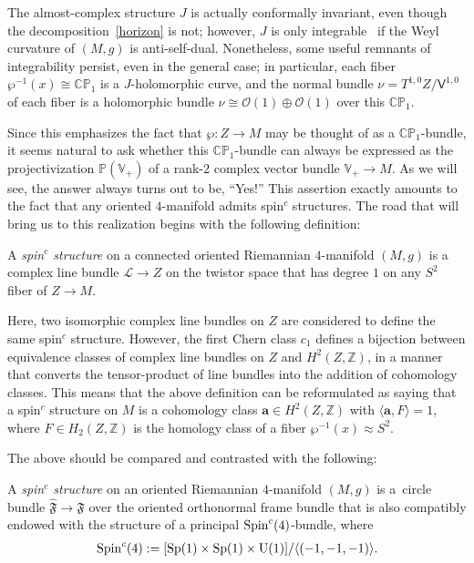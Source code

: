 \documentclass[pdftex]{sigma}
\numberwithin{equation}{section}
\def\CP{\mathbb{CP}}
\def\ZZ{\mathbb{Z}}
\begin{document}
The almost-complex structure $J$ is actually conformally invariant, even though the
decomposition~\eqref{horizon} is not; however, $J$ is only integrable~\cite{AHS,pnlg}
if the Weyl curvature of $(M,g)$ is anti-self-dual. Nonetheless, some useful remnants of integrability persist, even in the general
case; in particular, each fiber $\wp^{-1} (x)\cong \CP_1$ is a $J$-holomorphic curve, and the normal bundle
$\nu = T^{1,0} Z/\mathsf{V}^{1,0}$ of each fiber is a holomorphic bundle $\nu \cong \mathcal{O}(1) \oplus \mathcal{O}(1)$
over this $\CP_1$.

Since this emphasizes the fact that $\wp\colon Z\to M$ may be thought of as a $\CP_1$-bundle,
it seems natural to ask whether this $\CP_1$-bundle can always be expressed as
 the projectivization $\mathbb{P} (\mathbb{V}_+)$
of a rank-$2$ complex vector bundle $\mathbb{V}_+\to M$. As we will see, the answer always turns out to be, ``Yes!''
This assertion
 exactly amounts to the
fact that any oriented $4$-manifold admits spin$^c$ structures. The road that will bring us to this realization begins with the following
definition:

 \begin{geomdef}A {\em spin$^c$ structure} on a connected oriented Riemannian $4$-manifold $(M,g)$ is a complex line bundle ${\mathscr{L}}\to {Z}$
on the twistor space
that has degree $1$ on any ${S^2}$ fiber of ${Z}\to M$.
\end{geomdef}

Here, two isomorphic complex line bundles on $Z$ are considered to define the same spin$^c$ structure. However,
 the first Chern class $c_1$ defines a bijection between equivalence classes of complex line bundles on $Z$
and $H^2(Z, \ZZ)$, in a manner that converts the tensor-product of line bundles into the
addition of cohomology classes. This means that the above definition
can be reformulated as saying that a spin$^c$ structure on $M$ is a cohomology class
 $\mathbf{a} \in H^2(Z,\ZZ)$ with $\langle \mathbf{a}, F \rangle =1$, where
$F \in H_2 (Z, \ZZ )$ is the homology class of a fiber $\wp^{-1} (x) \approx S^2$.

The above should be compared and contrasted with the following:

\begin{standef}
A {\em spin$^c$ structure} on an oriented Riemannian $4$-manifold $(M,g)$ is a~circle bundle
$\widehat{\mathfrak{F}}\to \mathfrak{F}$
over the oriented orthonormal frame bundle that is also
compatibly endowed with the structure of a
 principal ${\rm Spin}^c(4)$-bundle, where
 \begin{gather*}
{\rm Spin}^c(4):= [{\rm Sp}(1)\times {\rm Sp}(1)\times {\rm U}(1)]/\langle (-1,-1, -1)\rangle .
\end{gather*}
\end{standef}
\end{document}
